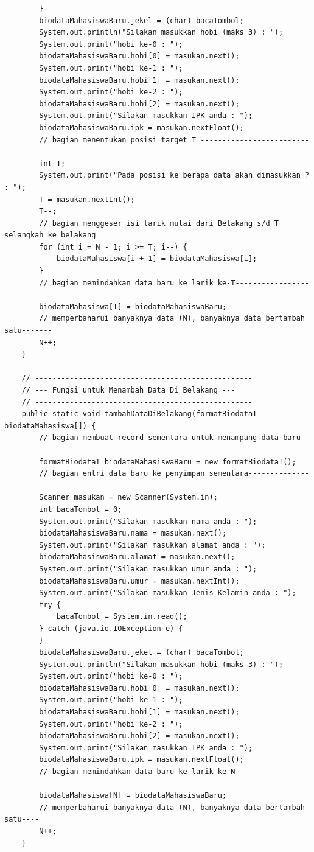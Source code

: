 \documentclass[a4paper,12pt]{article}
\begin{document}
\begin{lstlisting}
        }
        biodataMahasiswaBaru.jekel = (char) bacaTombol;
        System.out.println("Silakan masukkan hobi (maks 3) : ");
        System.out.print("hobi ke-0 : ");
        biodataMahasiswaBaru.hobi[0] = masukan.next();
        System.out.print("hobi ke-1 : ");
        biodataMahasiswaBaru.hobi[1] = masukan.next();
        System.out.print("hobi ke-2 : ");
        biodataMahasiswaBaru.hobi[2] = masukan.next();
        System.out.print("Silakan masukkan IPK anda : ");
        biodataMahasiswaBaru.ipk = masukan.nextFloat();
        // bagian menentukan posisi target T ----------------------------------
        int T;
        System.out.print("Pada posisi ke berapa data akan dimasukkan ? : ");
        T = masukan.nextInt();
        T--;
        // bagian menggeser isi larik mulai dari Belakang s/d T selangkah ke belakang
        for (int i = N - 1; i >= T; i--) {
            biodataMahasiswa[i + 1] = biodataMahasiswa[i];
        }
        // bagian memindahkan data baru ke larik ke-T----------------------
        biodataMahasiswa[T] = biodataMahasiswaBaru;
        // memperbaharui banyaknya data (N), banyaknya data bertambah satu-------
        N++;
    }

    // --------------------------------------------------
    // --- Fungsi untuk Menambah Data Di Belakang ---
    // --------------------------------------------------
    public static void tambahDataDiBelakang(formatBiodataT biodataMahasiswa[]) {
        // bagian membuat record sementara untuk menampung data baru-------------
        formatBiodataT biodataMahasiswaBaru = new formatBiodataT();
        // bagian entri data baru ke penyimpan sementara-----------------------
        Scanner masukan = new Scanner(System.in);
        int bacaTombol = 0;
        System.out.print("Silakan masukkan nama anda : ");
        biodataMahasiswaBaru.nama = masukan.next();
        System.out.print("Silakan masukkan alamat anda : ");
        biodataMahasiswaBaru.alamat = masukan.next();
        System.out.print("Silakan masukkan umur anda : ");
        biodataMahasiswaBaru.umur = masukan.nextInt();
        System.out.print("Silakan masukkan Jenis Kelamin anda : ");
        try {
            bacaTombol = System.in.read();
        } catch (java.io.IOException e) {
        }
        biodataMahasiswaBaru.jekel = (char) bacaTombol;
        System.out.println("Silakan masukkan hobi (maks 3) : ");
        System.out.print("hobi ke-0 : ");
        biodataMahasiswaBaru.hobi[0] = masukan.next();
        System.out.print("hobi ke-1 : ");
        biodataMahasiswaBaru.hobi[1] = masukan.next();
        System.out.print("hobi ke-2 : ");
        biodataMahasiswaBaru.hobi[2] = masukan.next();
        System.out.print("Silakan masukkan IPK anda : ");
        biodataMahasiswaBaru.ipk = masukan.nextFloat();
        // bagian memindahkan data baru ke larik ke-N-----------------------
        biodataMahasiswa[N] = biodataMahasiswaBaru;
        // memperbaharui banyaknya data (N), banyaknya data bertambah satu----
        N++;
    }


\end{lstlisting}
\end{document}
